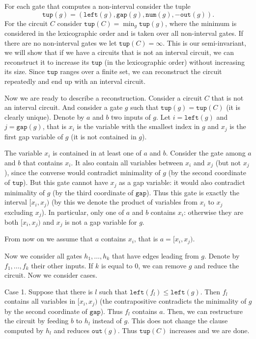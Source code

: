 \documentclass[11pt,letterpaper]{article}
\newcommand{\lef}{\texttt{left}}
\newcommand{\gap}{\texttt{gap}}
\newcommand{\num}{\texttt{num}}
\newcommand{\out}{\texttt{out}}
\newcommand{\tup}{\texttt{tup}}
\begin{document}
For each gate that computes a non-interval consider the tuple
$$
\tup(g)=(\lef(g),\gap(g),\num(g),-\out(g)).
$$ For the circuit $C$ consider $\tup(C) = \min_g \tup(g)$, where the minimum is considered in the lexicographic order and is taken over all non-interval gates. If there are no non-interval gates we let $\tup(C)=\infty$. This is our semi-invariant, we will show that if we have a circuits that is not an interval circuit, we can reconstruct it to increase  its $\tup$ (in the lexicographic order) without increasing its size. Since $\tup$ ranges over a finite set, we can reconstruct the circuit repeatedly and end up with an interval circuit.

Now we are ready to describe a reconstruction. Consider a circuit $C$ that is not an interval circuit. And consider a gate $g$ such that $\tup(g)=\tup(C)$ (it is clearly unique). Denote by $a$ and $b$ two inputs of $g$. Let $i=\lef(g)$ and $j=\gap(g)$, that is $x_i$ is the variable with the smallest index in $g$ and $x_j$ is the first gap variable of $g$ (it is not contained in $g$).

The variable $x_i$ is contained in at least one of $a$ and $b$. Consider the gate among $a$ and $b$ that contains $x_i$. It also contain all variables between $x_i$ and $x_j$ (but not $x_j$), since the converse would contradict minimality of $g$ (by the second coordinate of $\tup$). But this gate cannot have $x_j$ as a gap variable: it would also contradict minimality of $g$ (by the third coordinate of $\gap$). Thus this gate is exactly the interval $[x_i,x_j)$ (by this we denote the product of variables from $x_i$ to $x_j$ excluding $x_j$). In particular, only one of $a$ and $b$ contains $x_i$: otherwise they are both $[x_i,x_j)$ and $x_j$ is not a gap variable for $g$.

From now on we assume that $a$ contains $x_i$, that is $a=[x_i,x_j)$.

Now we consider all gates $h_1,\ldots, h_k$ that have edges leading from $g$. Denote by $f_1,\ldots, f_k$ their other inputs. If $k$ is equal to $0$, we can remove $g$ and reduce the circuit. Now we consider cases.

Case 1. Suppose that there is $l$ such that $\lef(f_l) \leq \lef(g)$. Then $f_l$ contains all variables in $[x_i,x_j)$ (the contrapositive contradicts the minimality of $g$ by the second coordinate of $\gap$). Thus $f_l$ contains $a$. Then, we can restructure the circuit by feeding $b$ to $h_l$ instead of $g$. This does not change the clause computed by $h_l$ and reduces $\out(g)$. Thus $\tup(C)$ increases and we are done.
\end{document}
